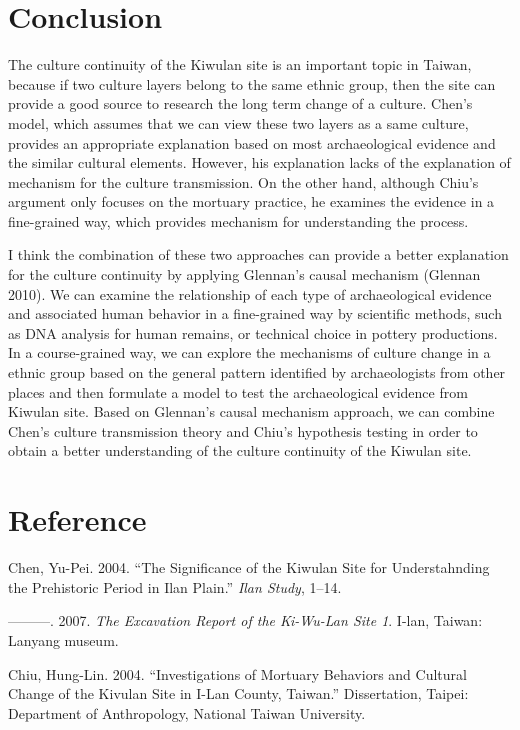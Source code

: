 \documentclass[10pt]{article}
\begin{document}
\section*{Conclusion}\label{conclusion}

The culture continuity of the Kiwulan site is an important topic in
Taiwan, because if two culture layers belong to the same ethnic group,
then the site can provide a good source to research the long term change
of a culture. Chen's model, which assumes that we can view these two
layers as a same culture, provides an appropriate explanation based on
most archaeological evidence and the similar cultural elements. However,
his explanation lacks of the explanation of mechanism for the culture
transmission. On the other hand, although Chiu's argument only focuses
on the mortuary practice, he examines the evidence in a fine-grained
way, which provides mechanism for understanding the process.

I think the combination of these two approaches can provide a better
explanation for the culture continuity by applying Glennan's causal
mechanism (Glennan 2010). We can examine the relationship of each type
of archaeological evidence and associated human behavior in a
fine-grained way by scientific methods, such as DNA analysis for human
remains, or technical choice in pottery productions. In a course-grained
way, we can explore the mechanisms of culture change in a ethnic group
based on the general pattern identified by archaeologists from other
places and then formulate a model to test the archaeological evidence
from Kiwulan site. Based on Glennan's causal mechanism approach, we can
combine Chen's culture transmission theory and Chiu's hypothesis testing
in order to obtain a better understanding of the culture continuity of
the Kiwulan site.

\section*{Reference}\label{reference}

Chen, Yu-Pei. 2004. ``The Significance of the Kiwulan Site for
Understahnding the Prehistoric Period in Ilan Plain.'' \emph{Ilan
Study}, 1--14.

---------. 2007. \emph{The Excavation Report of the Ki-Wu-Lan Site 1}.
I-lan, Taiwan: Lanyang museum.

Chiu, Hung-Lin. 2004. ``Investigations of Mortuary Behaviors and
Cultural Change of the Kivulan Site in I-Lan County, Taiwan.''
Dissertation, Taipei: Department of Anthropology, National Taiwan
University.
\end{document}
